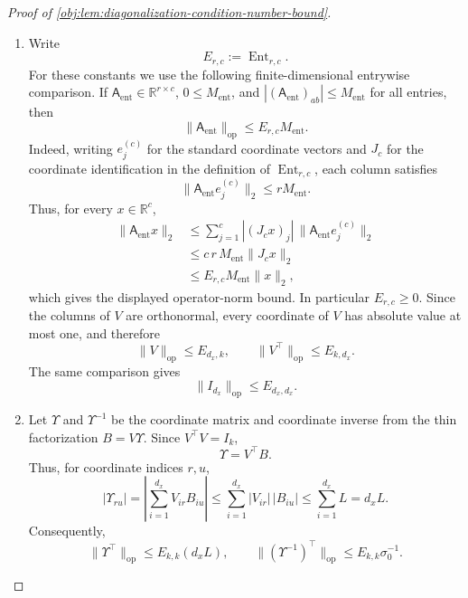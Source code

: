 \documentclass[11pt]{article}
\begin{document}
\begin{proof}[Proof of \cref{obj:lem:diagonalization-condition-number-bound}]
\begin{enumerate}
\item Write
\[
E_{r,c}:=\operatorname{Ent}_{r,c}.
\]
For these constants we use the following finite-dimensional entrywise comparison. If \(\mathsf A_{\mathrm{ent}}\in\mathbb R^{r\times c}\), \(0\le M_{\mathrm{ent}}\), and \(|(\mathsf A_{\mathrm{ent}})_{ab}|\le M_{\mathrm{ent}}\) for all entries, then
\[
\|\mathsf A_{\mathrm{ent}}\|_{\mathrm{op}}\le E_{r,c}M_{\mathrm{ent}} .
\]
Indeed, writing \(e_j^{(c)}\) for the standard coordinate vectors and \(J_c\) for the coordinate identification in the definition of \(\operatorname{Ent}_{r,c}\), each column satisfies
\[
\|\mathsf A_{\mathrm{ent}}e_j^{(c)}\|_2\le rM_{\mathrm{ent}} .
\]
Thus, for every \(x\in\mathbb R^c\),
\[
\begin{aligned}
\|\mathsf A_{\mathrm{ent}}x\|_2
&\le \sum_{j=1}^c |(J_cx)_j|\,\|\mathsf A_{\mathrm{ent}}e_j^{(c)}\|_2 \\
&\le c\,r\,M_{\mathrm{ent}}\|J_cx\|_2 \\
&\le E_{r,c}M_{\mathrm{ent}}\|x\|_2,
\end{aligned}
\]
which gives the displayed operator-norm bound. In particular \(E_{r,c}\ge0\). Since the columns of \(V\) are orthonormal, every coordinate of \(V\) has absolute value at most one, and therefore
\[
\|V\|_{\mathrm{op}}\le E_{d_x,k},
\qquad
\|V^\top\|_{\mathrm{op}}\le E_{k,d_x}.
\]
The same comparison gives
\[
\|I_{d_x}\|_{\mathrm{op}}\le E_{d_x,d_x}.
\]

\item Let \(\Upsilon\) and \(\Upsilon^{-1}\) be the coordinate matrix and coordinate inverse from the thin factorization \(B=V\Upsilon\). Since \(V^\top V=I_k\),
\[
\Upsilon=V^\top B .
\]
Thus, for coordinate indices \(r,u\),
\[
|\Upsilon_{ru}|
=
\left|\sum_{i=1}^{d_x}V_{ir}B_{iu}\right|
\le
\sum_{i=1}^{d_x}|V_{ir}|\,|B_{iu}|
\le
\sum_{i=1}^{d_x}L
=
d_xL .
\]
Consequently,
\[
\|\Upsilon^\top\|_{\mathrm{op}}\le E_{k,k}(d_xL),
\qquad
\|(\Upsilon^{-1})^\top\|_{\mathrm{op}}\le E_{k,k}\sigma_0^{-1}.
\]


\end{enumerate}
\end{proof}
\end{document}
